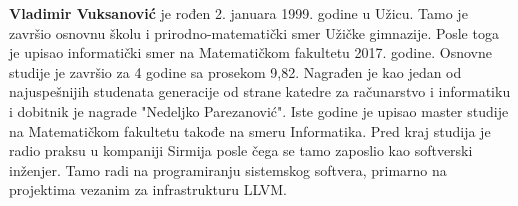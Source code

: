 \documentclass[12pt,oneside]{memoir}
\begin{document}
\literatura

\backmatter

\begin{biografija}
  \textbf{Vladimir Vuksanović} je rođen 2. januara 1999. godine u Užicu.
  Tamo je završio osnovnu školu i prirodno-matematički smer Užičke gimnazije.
  Posle toga je upisao informatički smer na Matematičkom fakultetu 2017. godine.
  Osnovne studije je završio za 4 godine sa prosekom 9,82.
  Nagrađen je kao jedan od najuspešnijih studenata generacije od strane katedre za računarstvo i informatiku i dobitnik je nagrade "Nedeljko Parezanović".
  Iste godine je upisao master studije na Matematičkom fakultetu takođe na smeru Informatika. 
  Pred kraj studija je radio praksu u kompaniji Sirmija posle čega se tamo zaposlio kao softverski inženjer.
  Tamo radi na programiranju sistemskog softvera, primarno na projektima vezanim za infrastrukturu LLVM.
\end{biografija}
\end{document}
